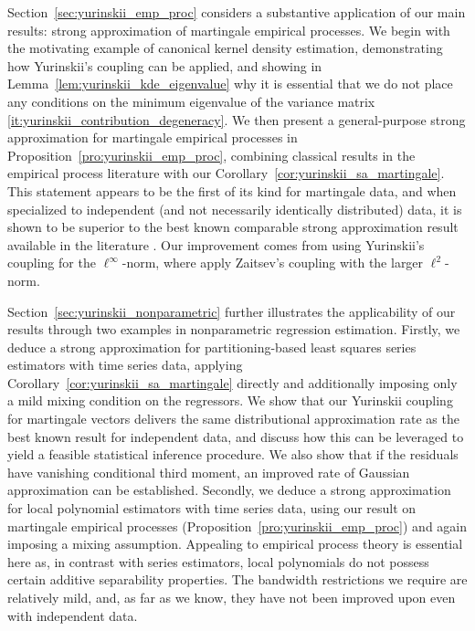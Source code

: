 \documentclass[11pt,lof]{puthesis}
\theoremstyle{break}
\theoremstyle{proof}
\begin{document}
Section~\ref{sec:yurinskii_emp_proc} considers a substantive application of our
main results: strong approximation of martingale empirical processes. We begin
with the motivating example of canonical kernel density estimation,
demonstrating how Yurinskii's coupling can be applied, and showing in
Lemma~\ref{lem:yurinskii_kde_eigenvalue} why it is essential that we do not
place any conditions on the minimum eigenvalue of the variance matrix
\ref{it:yurinskii_contribution_degeneracy}.
We then present a general-purpose strong
approximation for martingale empirical processes in
Proposition~\ref{pro:yurinskii_emp_proc}, combining classical results in the
empirical process literature \citep{van1996weak} with our
Corollary~\ref{cor:yurinskii_sa_martingale}. This statement appears to be the
first of its kind for martingale data, and when specialized to independent (and
not necessarily identically distributed) data, it is shown to be superior to
the best known comparable strong approximation result available in the
literature \citep{berthet2006revisiting}. Our improvement comes from using
Yurinskii's coupling for the $\ell^\infty$-norm, where
\citet{berthet2006revisiting} apply Zaitsev's coupling
\citep{zaitsev1987estimates, zaitsev1987gaussian} with the larger
$\ell^2$-norm.

Section~\ref{sec:yurinskii_nonparametric} further illustrates the applicability
of our
results through two examples in nonparametric regression estimation. Firstly,
we deduce a strong approximation for partitioning-based least squares series
estimators with time series data, applying
Corollary~\ref{cor:yurinskii_sa_martingale}
directly and additionally imposing only a mild mixing condition on the
regressors. We show that our Yurinskii coupling for martingale vectors delivers
the same distributional approximation rate as the best known result for
independent data, and discuss how this can be leveraged to yield a feasible
statistical inference procedure. We also show that if the residuals have
vanishing conditional third moment, an improved rate of Gaussian approximation
can be established. Secondly, we deduce a strong approximation for local
polynomial estimators with time series data,
using our result on martingale empirical processes
(Proposition~\ref{pro:yurinskii_emp_proc}) and again imposing a mixing
assumption.
Appealing to empirical process theory is essential here as, in contrast with
series estimators, local polynomials do not possess certain additive
separability properties. The bandwidth restrictions we require are relatively
mild, and, as far as we know, they have not been improved upon even with
independent data.
\end{document}
